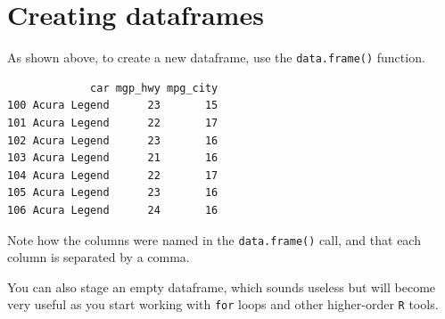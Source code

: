 \documentclass[
]{book}
\newenvironment{Shaded}{\begin{snugshade}}{\end{snugshade}}
\newcommand{\DecValTok}[1]{\textcolor[rgb]{0.00,0.00,0.81}{#1}}
\newcommand{\KeywordTok}[1]{\textcolor[rgb]{0.13,0.29,0.53}{\textbf{#1}}}
\newcommand{\NormalTok}[1]{#1}
\newcommand{\OperatorTok}[1]{\textcolor[rgb]{0.81,0.36,0.00}{\textbf{#1}}}
\newcommand{\StringTok}[1]{\textcolor[rgb]{0.31,0.60,0.02}{#1}}
\begin{document}
\begin{Shaded}
\end{Shaded}

\hypertarget{creating-dataframes}{%
\section*{Creating dataframes}\label{creating-dataframes}}

As shown above, to create a new dataframe, use the \texttt{data.frame()} function.

\begin{verbatim}
             car mgp_hwy mpg_city
100 Acura Legend      23       15
101 Acura Legend      22       17
102 Acura Legend      23       16
103 Acura Legend      21       16
104 Acura Legend      22       17
105 Acura Legend      23       16
106 Acura Legend      24       16
\end{verbatim}

Note how the columns were named in the \texttt{data.frame()} call, and that each column is separated by a comma.

You can also stage an empty dataframe, which sounds useless but will become very useful as you start working with \texttt{for} loops and other higher-order \texttt{R} tools.
\end{document}
